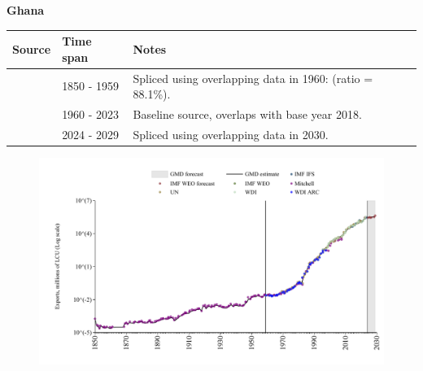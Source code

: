 \documentclass[12pt,a4paper,landscape]{article}
\begin{document}
\begin{adjustbox}{max totalsize={\paperwidth}{\paperheight},center}
\begin{minipage}[t][\textheight][t]{\textwidth}
\vspace*{0.5cm}
{}
\begin{center}
{\Large\bfseries Ghana}
\end{center}
\vspace{0.5cm}
\begin{table}[H]
\centering
\small
\begin{tabular}{|l|l|l|}
\hline
\textbf{Source} & \textbf{Time span} & \textbf{Notes} \\
\hline
\rowcolor{white}\cite{Mitchell}& 1850 - 1959 &Spliced using overlapping data in 1960: (ratio = 88.1\%).\\
\rowcolor{lightgray}\cite{WDI}& 1960 - 2023 &Baseline source, overlaps with base year 2018.\\
\rowcolor{white}\cite{IMF_WEO_forecast}& 2024 - 2029 &Spliced using overlapping data in 2030.\\
\hline
\end{tabular}
\end{table}
\begin{figure}[H]
\centering
\includegraphics[width=\textwidth,height=0.6\textheight,keepaspectratio]{graphs/GHA_exports.pdf}
\end{figure}
\end{minipage}
\end{adjustbox}
\end{document}
